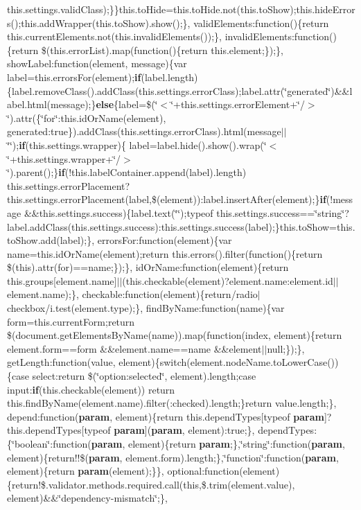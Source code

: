 {{\begin{DoxyParamCaption}
this.\+settings.\+valid\+Class);\}\}this.\+to\+Hide=this.\+to\+Hide.\+not(this.\+to\+Show);this.\+hide\+Errors();this.\+add\+Wrapper(this.\+to\+Show).show();\}, valid\+Elements\+:function()\{return this.\+current\+Elements.\+not(this.\+invalid\+Elements());\}, invalid\+Elements\+:function()\{return \$(this.\+error\+List).map(function()\{return this.\+element;\});\}, show\+Label\+:function(element, message)\{var label=this.\+errors\+For(element);{\bf if}(label.\+length)\{label.\+remove\+Class().add\+Class(this.\+settings.\+error\+Class);label.\+attr(\char`\"{}generated\char`\"{})\&\&label.\+html(message);\}{\bf else}\{label=\$(\char`\"{}$<$\char`\"{}+this.\+settings.\+error\+Element+\char`\"{}/$>$\char`\"{}).attr(\{\char`\"{}for\char`\"{}\+:this.\+id\+Or\+Name(element), generated\+:true\}).add\+Class(this.\+settings.\+error\+Class).html(message$\vert$$\vert$\char`\"{}\char`\"{});{\bf if}(this.\+settings.\+wrapper)\{   label=label.\+hide().show().wrap(\char`\"{}$<$\char`\"{}+this.\+settings.\+wrapper+\char`\"{}/$>$\char`\"{}).parent();\}{\bf if}(!this.\+label\+Container.\+append(label).length) this.\+settings.\+error\+Placement?this.\+settings.\+error\+Placement(label,\$(element))\+:label.\+insert\+After(element);\}{\bf if}(!message \&\&this.\+settings.\+success)\{label.\+text(\char`\"{}\char`\"{});typeof this.\+settings.\+success==\char`\"{}string\char`\"{}?label.\+add\+Class(this.\+settings.\+success)\+:this.\+settings.\+success(label);\}this.\+to\+Show=this.\+to\+Show.\+add(label);\}, errors\+For\+:function(element)\{var name=this.\+id\+Or\+Name(element);return this.\+errors().filter(function()\{return \$(this).attr(\textquotesingle{}for\textquotesingle{})==name;\});\}, id\+Or\+Name\+:function(element)\{return this.\+groups\mbox{[}element.\+name\mbox{]}$\vert$$\vert$(this.\+checkable(element)?element.\+name\+:element.\+id$\vert$$\vert$element.\+name);\}, checkable\+:function(element)\{return/radio$\vert$checkbox/i.\+test(element.\+type);\}, find\+By\+Name\+:function(name)\{var form=this.\+current\+Form;return \$(document.\+get\+Elements\+By\+Name(name)).map(function(index, element)\{return element.\+form==form \&\&element.\+name==name \&\&element$\vert$$\vert$null;\});\}, get\+Length\+:function(value, element)\{switch(element.\+node\+Name.\+to\+Lower\+Case())\{case \textquotesingle{}select\textquotesingle{}\+:return \$(\char`\"{}option\+:selected\char`\"{}, element).length;case \textquotesingle{}input\textquotesingle{}\+:{\bf if}(this.\+checkable(element)) return this.\+find\+By\+Name(element.\+name).filter(\textquotesingle{}\+:checked\textquotesingle{}).length;\}return value.\+length;\}, depend\+:function({\bf param}, element)\{return this.\+depend\+Types\mbox{[}typeof {\bf param}\mbox{]}?this.\+depend\+Types\mbox{[}typeof {\bf param}\mbox{]}({\bf param}, element)\+:true;\}, depend\+Types\+:\{\char`\"{}boolean\char`\"{}\+:function({\bf param}, element)\{return {\bf param};\},\char`\"{}string\char`\"{}\+:function({\bf param}, element)\{return!!\$({\bf param}, element.\+form).length;\},\char`\"{}function\char`\"{}\+:function({\bf param}, element)\{return {\bf param}(element);\}\}, optional\+:function(element)\{return!\$.\+validator.\+methods.\+required.\+call(this,\$.trim(element.\+value), element)\&\&\char`\"{}dependency-\/mismatch\char`\"{};\}, 
\end{DoxyParamCaption}}}
